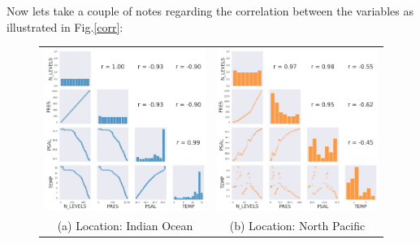 \documentclass[12pt]{article}
\begin{document}
Now lets take a couple of notes regarding the
correlation between the variables as illustrated in
Fig.\ref{corr}:
    

    
\begin{figure}[!ht]
    \begin{tabular}{cc}
        \hspace{-30pt} \includegraphics[width=70mm]{correlation1.png} &\hspace{10pt}   \includegraphics[width=70mm]{correlation2.png} \\
        (a) Location: Indian Ocean & (b) Location: North Pacific \\[15pt]

\end{tabular}
\end{figure}
\end{document}
